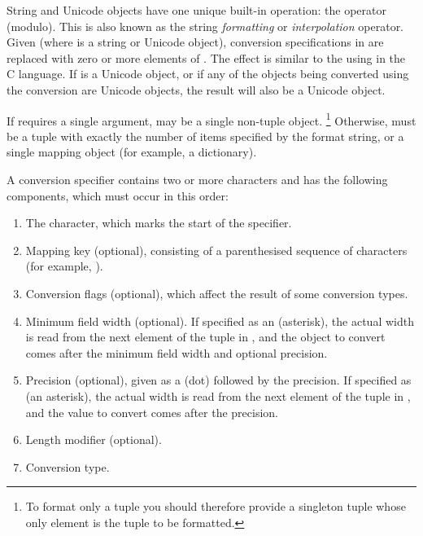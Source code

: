 String and Unicode objects have one unique built-in operation: the
\code{\%} operator (modulo).  This is also known as the string
\emph{formatting} or \emph{interpolation} operator.  Given
 (where  is a string or
Unicode object), \code{\%} conversion specifications in 
are replaced with zero or more elements of .  The effect
is similar to the using  in the C language.  If
 is a Unicode object, or if any of the objects being
converted using the  conversion are Unicode objects, the
result will also be a Unicode object.

If  requires a single argument,  may be a
single non-tuple object. \footnote{To format only a tuple you
should therefore provide a singleton tuple whose only element
is the tuple to be formatted.}  Otherwise,  must be a tuple with
exactly the number of items specified by the format string, or a
single mapping object (for example, a dictionary).

A conversion specifier contains two or more characters and has the
following components, which must occur in this order:

\begin{enumerate}
  \item  The \character{\%} character, which marks the start of the
         specifier.
  \item  Mapping key (optional), consisting of a parenthesised sequence
         of characters (for example, ).
  \item  Conversion flags (optional), which affect the result of some
         conversion types.
  \item  Minimum field width (optional).  If specified as an
         \character{*} (asterisk), the actual width is read from the
         next element of the tuple in , and the object to
         convert comes after the minimum field width and optional
         precision.
  \item  Precision (optional), given as a  (dot) followed
         by the precision.  If specified as \character{*} (an
         asterisk), the actual width is read from the next element of
         the tuple in , and the value to convert comes after
         the precision.
  \item  Length modifier (optional).
  \item  Conversion type.
\end{enumerate}

